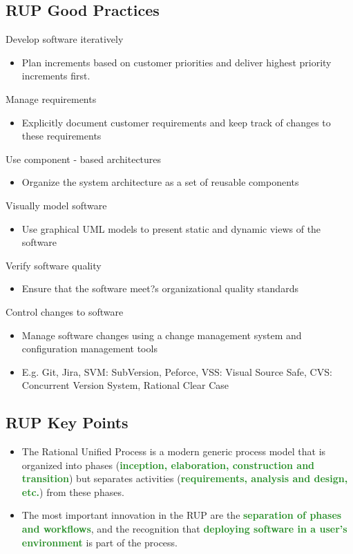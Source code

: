 \documentclass{report}
\newcommand{\textg}[1]{\textcolor{ForestGreen}{#1}}
\newcommand{\textbfg}[1]{\textbf{\textg{#1}}}
\begin{document}
\subsection{RUP Good Practices}
\noindent Develop software iteratively
\begin{itemize}
  \item Plan increments based on customer priorities and deliver highest priority increments first.
\end{itemize}
Manage requirements
\begin{itemize}
  \item Explicitly document customer requirements and keep track of changes to these requirements
\end{itemize}
Use component - based architectures
\begin{itemize}
  \item Organize the system architecture as a set of reusable components
\end{itemize}
Visually model software
\begin{itemize}
  \item Use graphical UML models to present static and dynamic views of the software
\end{itemize}
Verify software quality
\begin{itemize}
  \item Ensure that the software meet?s organizational quality standards
\end{itemize}
Control changes to software
\begin{itemize}
  \item Manage software changes using a change management system and configuration management tools
  \item E.g. Git, Jira, SVM: SubVersion, Peforce, VSS: Visual Source Safe, CVS: Concurrent Version System, Rational Clear Case
\end{itemize}

\subsection{RUP Key Points}
\begin{itemize}
  \item The Rational Unified Process is a modern generic process model that is organized into phases (\textbfg{inception, elaboration, construction and transition}) but separates activities (\textbfg{requirements, analysis and design, etc.}) from these phases.
  \item The most important innovation in the RUP are the \textbfg{separation of phases and workflows}, and the recognition that \textbfg{deploying software in a user's environment} is part of the process.
\end{itemize}
\end{document}

